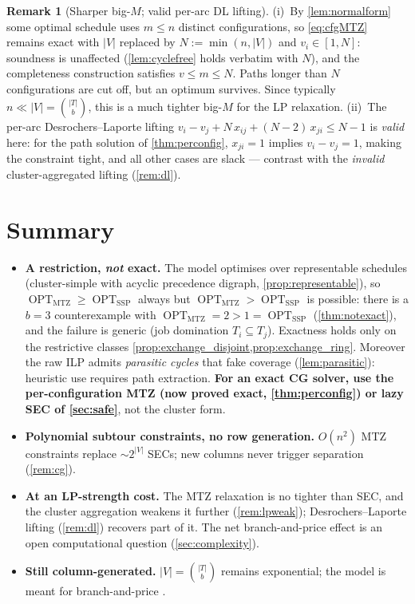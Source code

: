 \documentclass[11pt,a4paper]{article}
\theoremstyle{plain}
\theoremstyle{definition}
\newtheorem{remark}[theorem]{Remark}
\DeclareMathOperator{\OPT}{OPT}
\newcommand{\OMTZ}{\OPT_{\mathrm{MTZ}}}
\newcommand{\OSSP}{\OPT_{\mathrm{SSP}}}
\begin{document}
\begin{thmbox}
	\begin{remark}[Sharper big-$M$; valid per-arc DL lifting]
		\label{rem:bigM}
		(i)~By \cref{lem:normalform} some optimal schedule uses $m\le n$ distinct
		configurations, so \eqref{eq:cfgMTZ} remains exact with $|V|$ replaced by
		$N:=\min(n,|V|)$ and $v_i\in[1,N]$: soundness is unaffected (\cref{lem:cyclefree}
		holds verbatim with $N$), and the completeness construction satisfies $v\le m\le N$.
		Paths longer than $N$ configurations are cut off, but an optimum survives. Since
		typically $n\ll|V|=\binom{|T|}{b}$, this is a much tighter big-$M$ for the LP
		relaxation. (ii)~The per-arc Desrochers--Laporte lifting
		$v_i-v_j+N\,x_{ij}+(N-2)\,x_{ji}\le N-1$ is \emph{valid} here: for the path solution
		of \cref{thm:perconfig}, $x_{ji}=1$ implies $v_i-v_j=1$, making the constraint tight,
		and all other cases are slack --- contrast with the \emph{invalid} cluster-aggregated
		lifting (\cref{rem:dl}).
	\end{remark}
\end{thmbox}

\section{Summary}
\label{sec:summary}

\begin{itemize}
	\item \textbf{A restriction, \emph{not} exact.} The model optimises over representable
	schedules (cluster-simple with acyclic precedence digraph, \cref{prop:representable}), so
	$\OMTZ\ge\OSSP$ always but $\OMTZ>\OSSP$ is possible: there is a $b=3$ counterexample with
	$\OMTZ=2>1=\OSSP$ (\cref{thm:notexact}), and the failure is generic (job domination
	$T_i\subseteq T_j$). Exactness holds only on the restrictive classes
	\cref{prop:exchange_disjoint,prop:exchange_ring}. Moreover the raw ILP admits
	\emph{parasitic cycles} that fake coverage (\cref{lem:parasitic}): heuristic use requires
	path extraction. \textbf{For an exact CG solver, use the
	per-configuration MTZ (now proved exact, \cref{thm:perconfig}) or lazy SEC of
	\cref{sec:safe}}, not the cluster form.
	\item \textbf{Polynomial subtour constraints, no row generation.} $O(n^{2})$ MTZ
	constraints \cite{Miller1960} replace $\sim2^{|V|}$ SECs; new columns never trigger
	separation (\cref{rem:cg}).
	\item \textbf{At an LP-strength cost.} The MTZ relaxation is no tighter than SEC, and the
	cluster aggregation weakens it further (\cref{rem:lpweak}); Desrochers--Laporte lifting
	(\cref{rem:dl}) recovers part of it. The net branch-and-price effect is an open
	computational question (\cref{sec:complexity}).
	\item \textbf{Still column-generated.} $|V|=\binom{|T|}{b}$ remains exponential; the model
	is meant for branch-and-price \cite{Barnhart1998,Lubbecke2005}.
\end{itemize}
\end{document}
